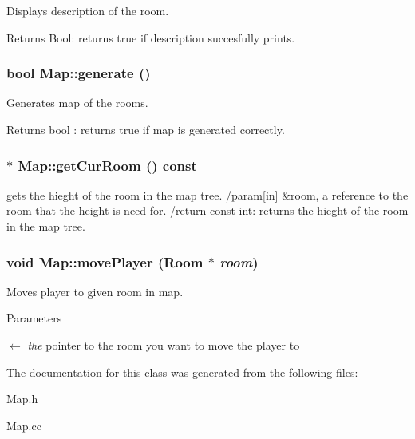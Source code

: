 Displays description of the room. \begin{DoxyReturn}{Returns}
Bool: returns true if description succesfully prints. 
\end{DoxyReturn}
\hypertarget{classMap_a5e9b9f6d6acbc48ec4d0b582a0243a32}{
\subsubsection[{generate}]{\setlength{\rightskip}{0pt plus 5cm}bool Map::generate ()}}
\label{classMap_a5e9b9f6d6acbc48ec4d0b582a0243a32}


Generates map of the rooms. \begin{DoxyReturn}{Returns}
bool : returns true if map is generated correctly. 
\end{DoxyReturn}
\hypertarget{classMap_a285c84b0ccc05f50ecf4a65fb7f78b43}{
\subsubsection[{getCurRoom}]{$\ast$ Map::getCurRoom () const}}
\label{classMap_a285c84b0ccc05f50ecf4a65fb7f78b43}


gets the hieght of the room in the map tree. /param\mbox{[}in\mbox{]} \&room, a reference to the room that the height is need for. /return const int: returns the hieght of the room in the map tree. \hypertarget{classMap_a23a910ea4dbd706458297c79f587e24f}{
\subsubsection[{movePlayer}]{\setlength{\rightskip}{0pt plus 5cm}void Map::movePlayer ({\bf Room} $\ast$ {\em room})}}
\label{classMap_a23a910ea4dbd706458297c79f587e24f}


Moves player to given room in map. 
\begin{DoxyParams}{Parameters}
\item[\mbox{$\leftarrow$} {\em the}]pointer to the room you want to move the player to \end{DoxyParams}


The documentation for this class was generated from the following files:\begin{DoxyCompactItemize}
\item 
Map.h\item 
Map.cc\end{DoxyCompactItemize}
